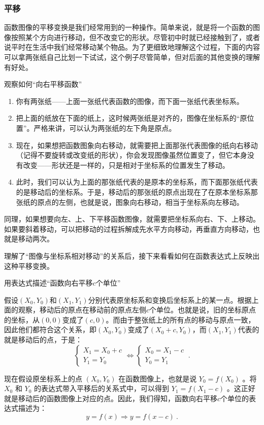 \subsubsection{平移}

函数图像的平移变换是我们经常用到的一种操作。简单来说，就是将一个函数的图像按照某个方向进行移动，但不改变它的形状。尽管初中时就已经接触到了，或者说平时在生活中我们经常移动某个物品。为了更细致地理解这个过程，下面的内容可以拿两张纸自己比划一下试试，这个例子尽管简单，但对后面的其他变换的理解有好处。

\begin{example}{观察如何“向右平移函数”}
\begin{enumerate}
\item 你有两张纸——上面一张纸代表函数的图像，而下面一张纸代表坐标系。
\item 把上面的纸放在下面的纸上，这时候两张纸是对齐的，图像在坐标系的“原位置”。严格来讲，可以认为两张纸的左下角是原点。
\item 现在，如果想把函数图象向右移动，就需要把上面那张代表图像的纸向右移动（记得不要旋转或改变纸的形状），你会发现图像虽然位置变了，但它本身没有改变——形状还是一样的，只是相对于坐标系的位置发生了移动。
\item 此时，我们可以认为上面的那张纸代表的是原本的坐标系，而下面那张纸代表的是移动后的坐标系。于是，移动后的那张纸的原点出现在了在原本坐标系那张纸的原点的左侧，也就是说，图象向右移动，相当于坐标系向左移动。
\end{enumerate}
\end{example}

同理，如果想要向左、上、下平移函数图像，就需要把坐标系向右、下、上移动。如果要斜着移动，可以把移动的过程拆解成先水平方向移动，再垂直方向移动，也就是移动两次。

理解了“图像与坐标系相对移动”的关系后，接下来看看如何在函数表达式上反映出这种平移变换。

\begin{example}{用表达式描述“函数向右平移$c$个单位”}

假设$(X_0,Y_0)$和$(X_1,Y_1)$分别代表原坐标系和变换后坐标系上的某一点。根据上面的观察，移动后的原点在移动前的原点左侧$c$个单位。也就是说，旧的坐标原点的坐标，从$(0,0)$变成了$(c,0)$。而由于整张纸上的所有点的移动与原点一致，因此他们都符合这个关系，即$(X_0,Y_0)$变成了$(X_0+c,Y_0)$，而$(X_1,Y_1)$代表的就是移动后的点，于是：
\begin{equation}
\begin{cases}
X_1=X_0+c\\
Y_1=Y_0
\end{cases}\iff
\begin{cases}
X_0=X_1-c\\
Y_0=Y_1
\end{cases}~.
\end{equation}

现在假设原坐标系上的点  $(X_0, Y_0)$  在函数图像上，也就是说  $Y_0 = f(X_0)$ 。将  $X_0$  和  $Y_0$  的表达式带入平移后的关系式中，可以得到  $Y_1 = f(X_1 - c)$ 。这正好就是移动后的函数图像上对应的点。因此，我们得知，函数向右平移$c$个单位的表达式描述为：
\begin{equation}
y=f(x)\Rightarrow y=f(x-c)~.
\end{equation}
\end{example}

